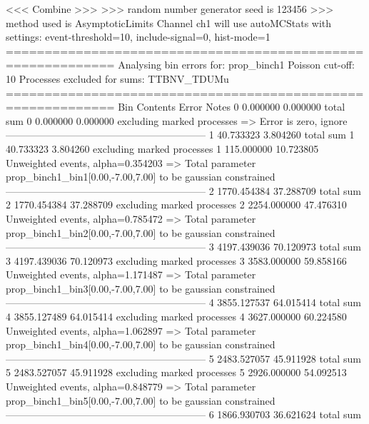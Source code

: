  <<< Combine >>> 
>>> random number generator seed is 123456
>>> method used is AsymptoticLimits
Channel ch1 will use autoMCStats with settings: event-threshold=10, include-signal=0, hist-mode=1
============================================================
Analysing bin errors for: prop_binch1
Poisson cut-off: 10
Processes excluded for sums: TTBNV_TDUMu
============================================================
Bin        Contents        Error           Notes                         
0          0.000000        0.000000        total sum                     
0          0.000000        0.000000        excluding marked processes    
  => Error is zero, ignore      
------------------------------------------------------------
1          40.733323       3.804260        total sum                     
1          40.733323       3.804260        excluding marked processes    
1          115.000000      10.723805       Unweighted events, alpha=0.354203
  => Total parameter prop_binch1_bin1[0.00,-7.00,7.00] to be gaussian constrained
------------------------------------------------------------
2          1770.454384     37.288709       total sum                     
2          1770.454384     37.288709       excluding marked processes    
2          2254.000000     47.476310       Unweighted events, alpha=0.785472
  => Total parameter prop_binch1_bin2[0.00,-7.00,7.00] to be gaussian constrained
------------------------------------------------------------
3          4197.439036     70.120973       total sum                     
3          4197.439036     70.120973       excluding marked processes    
3          3583.000000     59.858166       Unweighted events, alpha=1.171487
  => Total parameter prop_binch1_bin3[0.00,-7.00,7.00] to be gaussian constrained
------------------------------------------------------------
4          3855.127537     64.015414       total sum                     
4          3855.127489     64.015414       excluding marked processes    
4          3627.000000     60.224580       Unweighted events, alpha=1.062897
  => Total parameter prop_binch1_bin4[0.00,-7.00,7.00] to be gaussian constrained
------------------------------------------------------------
5          2483.527057     45.911928       total sum                     
5          2483.527057     45.911928       excluding marked processes    
5          2926.000000     54.092513       Unweighted events, alpha=0.848779
  => Total parameter prop_binch1_bin5[0.00,-7.00,7.00] to be gaussian constrained
------------------------------------------------------------
6          1866.930703     36.621624       total sum                     
